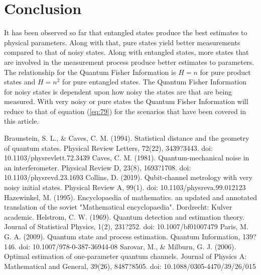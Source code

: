 \documentclass[twocolumn]{article}
\begin{document}
\section*{Conclusion}
It has been observed so far that entangled states produce the best estimates to physical parameters. Along with that, pure states yield better measurements compared to that of noisy states. Along with entangled states, more states that are involved in the measurement process produce better estimates to parameters. The relationship for the Quantum Fisher Information is $H=n$ for pure product states and $H=n^2$ for pure entangled states. The Quantum Fisher Information for noisy states is dependent upon how noisy the states are that are being measured. With very noisy or pure states the Quantum Fisher Information will reduce to that of equation (\ref{eq:79}) for the scenarios that have been covered in this article.
\newpage
\begin{thebibliography}{99}
Braunstein, S. L., \& Caves, C. M. (1994). Statistical distance and the geometry of quantum states. Physical Review Letters, 72(22), 3439?3443. doi: 10.1103/physrevlett.72.3439
Caves, C. M. (1981). Quantum-mechanical noise in an interferometer. Physical Review D, 23(8), 1693?1708. doi: 10.1103/physrevd.23.1693
Collins, D. (2019). Qubit-channel metrology with very noisy initial states. Physical Review A, 99(1). doi: 10.1103/physreva.99.012123
Hazewinkel, M. (1995). Encyclopaedia of mathematics. an updated and annotated translation of the soviet "Mathematical encyclopaedia". Dordrecht: Kulver academic.
Helstrom, C. W. (1969). Quantum detection and estimation theory. Journal of Statistical Physics, 1(2), 231?252. doi: 10.1007/bf01007479
Paris, M. G. A. (2009). Quantum state and process estimation. Quantum Information, 139?146. doi: 10.1007/978-0-387-36944-08
Sarovar, M., \& Milburn, G. J. (2006). Optimal estimation of one-parameter quantum channels. Journal of Physics A: Mathematical and General, 39(26), 8487?8505. doi: 10.1088/0305-4470/39/26/015
\end{thebibliography}
\end{document}

